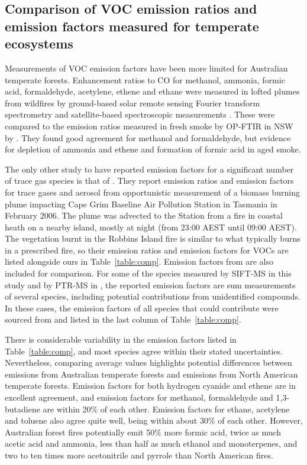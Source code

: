 \documentclass[acp, manuscript]{copernicus}
\begin{document}
\subsection{Comparison of VOC emission ratios and emission factors measured for temperate ecosystems}
Measurements of VOC emission factors have been more limited for Australian temperate forests. Enhancement ratios to CO for methanol, ammonia, formic acid, formaldehyde, acetylene, ethene and ethane were measured in lofted plumes from wildfires by ground-based solar remote sensing Fourier transform spectrometry \citep{Paton-Walsh2005, Paton-Walsh2008} and satellite-based spectroscopic measurements \citep{Young2011,Glatthor2013}. These were compared to the emission ratios measured in fresh smoke by OP-FTIR in NSW by \citet{Paton-Walsh2014}. They found good agreement for methanol and formaldehyde, but evidence for depletion of ammonia and ethene and formation of formic acid in aged smoke. 
 
The only other study to have reported emission factors for a significant number of trace gas species is that of \citet{Lawson2015}. They report emission ratios and emission factors for trace gases and aerosol from opportunistic measurement of a biomass burning plume impacting Cape Grim Baseline Air Pollution Station in Tasmania in February 2006. The plume was advected to the Station from a fire in coastal heath on a nearby island, mostly at night (from 23:00 AEST until 09:00 AEST). The vegetation burnt in the Robbins Island fire is similar to what typically burns in a prescribed fire, so their emission ratios and emission factors for VOCs are listed alongside ours in Table~\ref{table:comp}. Emission factors from  \citet[Table S4, February 2015 update]{Akagi2011} are also included for comparison. For some of the species measured by SIFT-MS in this study and by PTR-MS in \citet{Lawson2015}, the reported emission factors are sum measurements of several species, including potential contributions from unidentified compounds. In these cases, the emission factors of all species that could contribute were sourced from \citet[Table S4, February 2015 update]{Akagi2011} and listed in the last column of Table~\ref{table:comp}. 

There is considerable variability in the emission factors listed in Table~\ref{table:comp}, and most species agree within their stated uncertainties. Nevertheless, comparing average values highlights potential differences between emissions from Australian temperate forests and emissions from North American temperate forests. Emission  factors for both hydrogen cyanide and ethene are in excellent agreement, and emission factors for methanol, formaldehyde and 1,3-butadiene are within 20$\%$ of each other. Emission factors for ethane, acetylene and toluene also agree quite well, being within about 30$\%$ of each other. However, Australian forest fires potentially emit 50$\%$ more formic acid, twice as much acetic acid and ammonia, less than half as much ethanol and monoterpenes, and two to ten times more acetonitrile and pyrrole than North American fires. 
\end{document}
